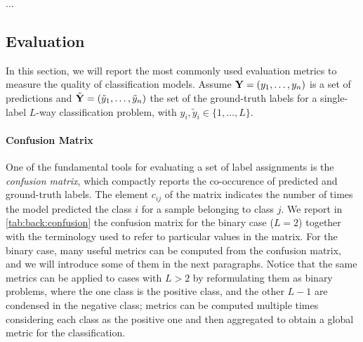 ...
\subsection{Evaluation}
\label{subsec:back:classif-eval}

In this section, we will report the most commonly used evaluation metrics to measure the quality of classification models.
Assume $\mathbf{Y} = (y_1, \ldots, y_n)$ is a set of predictions and $\tilde{\mathbf{Y}} = (\tilde{y}_1, \ldots, \tilde{y}_n)$ the set of the ground-truth labels for a single-label $L$-way classification problem, with $y_i, \tilde{y}_i \in \{1, \ldots, L\}$. %

\paragraph{Confusion Matrix}
One of the fundamental tools for evaluating a set of label assignments is the \emph{confusion matrix}, which compactly reports the co-occurence of predicted and ground-truth labels.
The element $c_{ij}$ of the matrix indicates the number of times the model predicted the class $i$ for a sample belonging to class $j$.
We report in \ref{tab:back:confusion} the confusion matrix for the binary case ($L=2$) together with the terminology used to refer to particular values in the matrix.
For the binary case, many useful metrics can be computed from the confusion matrix, and we will introduce some of them in the next paragraphs.
Notice that the same metrics can be applied to cases with $L > 2$ by reformulating them as binary problems, where the one class is the positive class, and the other $L-1$ are condensed in the negative class;
metrics can be computed multiple times considering each class as the positive one and then aggregated to obtain a global metric for the classification.

